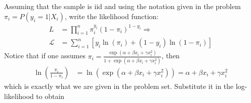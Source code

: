 \documentclass[]{article}
\begin{document}
\subsection{}
Assuming that the sample is iid and using the notation given in the problem $\pi_i = P(y_i = 1|X_i)$, write the likelihood function:
\begin{equation}
	\begin{split}
		L& = \prod\limits_{i = 1}^n\pi_i^{y_i}(1 - \pi_i)^{1 - y_i} \Rightarrow \\ \nonumber
		\mathcal{L}& = \sum\limits_{i = 1}^n\left[y_i\ln(\pi_i) + (1 - y_i)\ln(1 - \pi_i)\right]
	\end{split}
\end{equation}
Notice that if one assumes $\pi_i = \frac{\exp(\alpha + \beta x_i + \gamma x_i^2)}{1 + \exp(\alpha + \beta x_i + \gamma x_i^2)}$, then
\begin{equation}
	\begin{split}
		\ln\left(\frac{\pi_i}{1 - \pi_i}\right)& = \ln\left(\exp(\alpha + \beta x_i + \gamma x_i^2)\right) = \alpha + \beta x_i + \gamma x_i^2 \nonumber
	\end{split}
\end{equation}
which is exactly what we are given in the problem set. Substitute it in the log-likelihood to obtain
\end{document}
